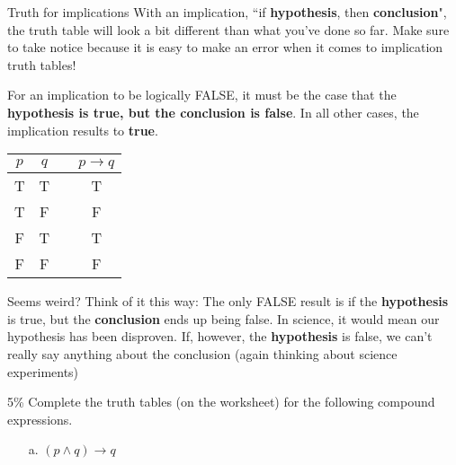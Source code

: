 \documentclass[a4paper,12pt]{book}
\begin{document}
        \newpage
        \begin{intro}{Truth for implications}
            With an implication, ``if \textbf{hypothesis}, then \textbf{conclusion}",
            the truth table will look a bit different than what you've done so far.
            Make sure to take notice because it is easy to make an error when it
            comes to implication truth tables!

            For an implication to be logically FALSE, it must be the case that
            the \textbf{hypothesis is true, but the conclusion is false}. In
            all other cases, the implication results to \textbf{true}.

            \begin{center}
                \begin{tabular}{| c | c | c | c |}
                    \hline{}
                    $p$ & $q$ & & $p \to q$
                    \\ \hline
                    T & T & & T
                    \\ \hline

                    T & F & & F
                    \\ \hline

                    F & T & & T
                    \\ \hline

                    F & F & & F
                    \\ \hline
                \end{tabular}
            \end{center}

            Seems weird? Think of it this way: The only FALSE result is if
            the \textbf{hypothesis} is true, but the \textbf{conclusion}
            ends up being false. In science, it would mean our hypothesis
            has been disproven. If, however, the \textbf{hypothesis}
            is false, we can't really say anything about the conclusion
            (again thinking about science experiments)
        \end{intro}

        \begin{question}{1}{5\%}
            Complete the truth tables (on the worksheet) for the following
            compound expressions.

            \begin{enumerate}
                \item[a.] $(p \land q) \to q$
            \end{enumerate}
        \end{question}
\end{document}
